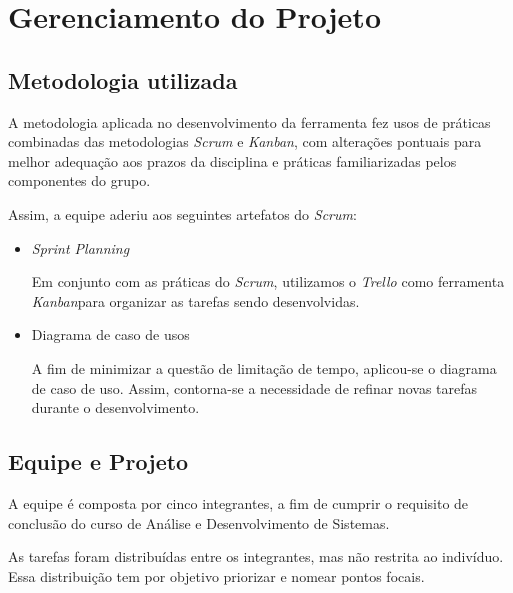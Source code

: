 \chapter{Gerenciamento do Projeto}

	\section{Metodologia utilizada}
		
		A metodologia aplicada no desenvolvimento da ferramenta fez usos de práticas combinadas das metodologias \textit{Scrum} e \textit{Kanban}, com alterações pontuais para melhor adequação aos prazos da disciplina e práticas familiarizadas pelos componentes do grupo.

		Assim, a equipe aderiu aos seguintes artefatos do \textit{Scrum}:

		\begin{itemize}
			\item 
				\textit{Sprint Planning}

				Em conjunto com as práticas do \textit{Scrum}, utilizamos o \textit{Trello} como ferramenta \textit{Kanban}para organizar as tarefas sendo desenvolvidas.

			\item 
				Diagrama de caso de usos
				
				A fim de minimizar a questão de limitação de tempo, aplicou-se o diagrama de caso de uso. Assim, contorna-se a necessidade de refinar novas tarefas durante o desenvolvimento.

		\end{itemize}
		
	\section{Equipe e Projeto}

		A equipe é composta por cinco integrantes, a fim de cumprir o requisito de conclusão do curso de Análise e Desenvolvimento de Sistemas.

		As tarefas foram distribuídas entre os integrantes, mas não restrita ao indivíduo. Essa distribuição tem por objetivo priorizar e nomear pontos focais.
		

